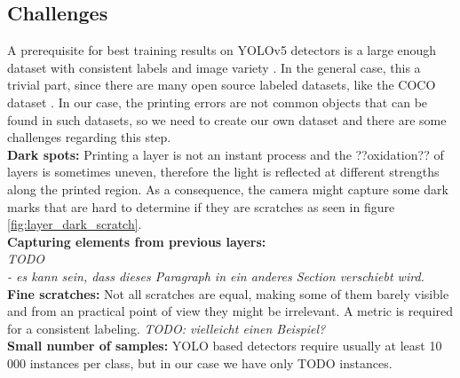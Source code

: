 \subsection{Challenges}
A prerequisite for best training results on YOLOv5 detectors is a large enough dataset with consistent labels and image variety \cite{yolov5_dataset}. In the general case, this a trivial part, since there are many open source labeled datasets, like the COCO dataset \cite{coco}. In our case, the printing errors are not common objects that can be found in such datasets, so we need to create our own dataset and there are some challenges regarding this step.\\
\textbf{Dark spots:} Printing a layer is not an instant process and the ??oxidation?? of layers is sometimes uneven, therefore the light is reflected at different strengths along the printed region. As a consequence, the camera might capture some dark marks that are hard to determine if they are scratches as seen in figure \ref{fig:layer_dark_scratch}.\\
\textbf{Capturing elements from previous layers:} \\
\textit{TODO} \\
\textit{- es kann sein, dass dieses Paragraph in ein anderes Section verschiebt wird.} \\
\textbf{Fine scratches:} Not all scratches are equal, making some of them barely visible and from an practical point of view they might be irrelevant. A metric is required for a consistent labeling. \textit{TODO: vielleicht einen Beispiel?}\\
\textbf{Small number of samples:} YOLO based detectors require usually at least 10 000 instances per class, but in our case we have only TODO instances.






